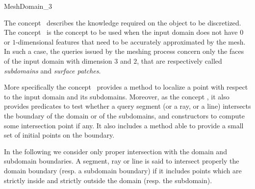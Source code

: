 \ccRefPageBegin


\begin{ccRefConcept}{MeshDomain_3}


\ccDefinition
  
The concept \ccRefName\ describes the knowledge required on the
object to be discretized. 
The concept \ccRefName\  is the concept to be used when the input
domain does not have $0$ or $1$-dimensional features that need to be
accurately approximated by the mesh. 
In such a case, the queries issued by the meshing process concern only the faces of the input domain with dimension $3$
and $2$, that are respectively called {\em subdomains} and {\em surface patches}.

More specifically the concept \ccRefName\  provides 
a method to localize a point with respect to the  input domain
and its subdomains.
Moreover, as the concept , 
it also provides  
 predicates to test whether a query segment
(or a ray,  or a line) intersects the boundary of the domain or 
of the subdomains, and constructors 
 to compute some intersection point if any. 
It also includes a method able to provide
a small set of initial points on the boundary. 

In the following we consider only proper intersection with the domain and
subdomain boundaries. 
A segment, ray or line is said to intersect properly the domain boundary
(resp. a subdomain boundary)
if it includes points which are strictly inside
and strictly outside  the domain (resp. the subdomain).






\ccTypes



\end{ccRefConcept}
